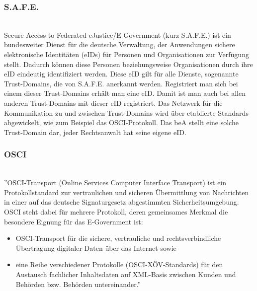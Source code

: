 \subsubsection{S.A.F.E.}\hspace*{\fill} \\
Secure Access to Federated eJustice/E-Government (kurz S.A.F.E.) ist ein bundesweiter Dienst für die deutsche Verwaltung, der Anwendungen sichere elektronische Identitäten (eIDs) für Personen und Organisationen zur Verfügung stellt. Dadurch können diese Personen beziehungsweise Organisationen durch ihre eID eindeutig identifiziert werden. \cite{bea:safe} Diese eID gilt für alle Dienste, sogenannte Trust-Domains, die von S.A.F.E. anerkannt werden. Registriert man sich bei einem dieser Trust-Domains erhält man eine eID. Damit ist man auch bei allen anderen Trust-Domains mit dieser eID registriert. Das Netzwerk für die Kommunikation zu und zwischen Trust-Domains wird über etablierte Standards abgewickelt, wie zum Beispiel das OSCI-Protokoll. Das beA stellt eine solche Trust-Domain dar, jeder Rechtsanwalt hat seine eigene eID.

\subsubsection{OSCI}\hspace*{\fill} \\
\label{sec:bea:sicherheit:osci}
''OSCI-Transport (Online Services Computer Interface Transport) ist ein Protokollstandard zur vertraulichen und sicheren Übermittlung von Nachrichten in einer auf das deutsche Signaturgesetz abgestimmten Sicherheitsumgebung. OSCI steht dabei für mehrere Protokoll, deren gemeinsames Merkmal die besondere Eignung für das E-Government ist:
\begin{itemize}
	\item OSCI-Transport für die sichere, vertrauliche und rechtsverbindliche Übertragung digitaler Daten über das Internet sowie
	\item eine Reihe verschiedener Protokolle (OSCI-XÖV-Standards) für den Austausch fachlicher Inhaltsdaten auf XML-Basis zwischen Kunden und Behörden bzw. Behörden untereinander.'' \cite{bea:osci}
\end{itemize}

